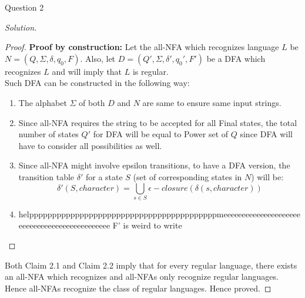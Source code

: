 \begin{solution}{Question 2}
\begin{proof}[Solution]
\begin{proof}
            \textbf{Proof by construction: }
            Let the all-NFA which recognizes language $L$ be $N = (Q, \Sigma, \delta, q_0, F)$. Also, let $D = (Q', \Sigma, \delta', q_0', F')$ be a DFA which recognizes $L$ and will imply that $L$ is regular.\\
            Such DFA can be constructed in the following way:
            \begin{enumerate}
                \item The alphabet $\Sigma$ of both $D$ and $N$ are same to ensure same input strings.
                \item Since all-NFA requires the string to be accepted for all Final states, the total number of states $Q'$ for DFA will be equal to Power set of $Q$ since DFA will have to consider all possibilities as well.
                \item Since all-NFA might involve epsilon transitions, to have a DFA version, the transition table $\delta'$ for a state $S$ (set of corresponding states in $N$) will be: \\
                 \[ \delta'(S, character) =  \bigcup_{s \in S}  \epsilon-closure(\delta(s, character)) \] 
                 \item helpppppppppppppppppppppppppppppppppppppppppmeeeeeeeeeeeeeeeeeeeeeeeeeeeeeeeeeeeeeeeeeeeeee F' is weird to write
            \end{enumerate}
            
        \end{proof}
        Both Claim 2.1 and Claim 2.2 imply that for every regular language, there exists an all-NFA which recognizes and all-NFAs only recognize regular languages. Hence all-NFAs recognize the class of regular languages. Hence proved.
        
        
    \end{proof}
\end{solution}
